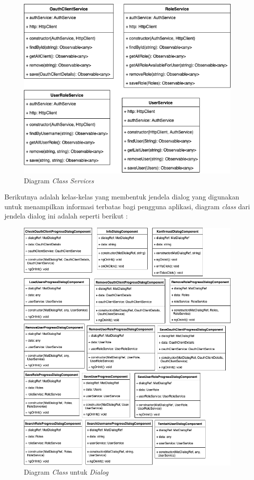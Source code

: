 \documentclass[pdftex,12pt, oneside]{article}
\begin{document}
\begin{figure}[H]
	\centering
	\includegraphics[width=1\textwidth]{./resources/class-dia-services}
	\caption{Diagram \textit{Class Services}}
	\label{fig:class-dia-services}
\end{figure}

Berikutnya adalah kelas-kelas yang membentuk jendela dialog yang digunakan untuk menampilkan informasi terbatas bagi pengguna aplikasi, diagram \textit{class} dari jendela dialog ini adalah seperti berikut :

\begin{figure}[H]
	\centering
	\includegraphics[width=1\textwidth]{./resources/class-dia-dialog}
	\caption{Diagram \textit{Class} untuk \textit{Dialog}}
	\label{fig:class-dia-dialog}
\end{figure}
\end{document}
